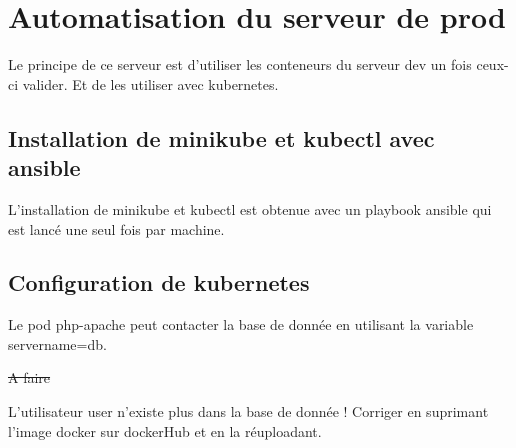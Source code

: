 \section{Automatisation du serveur de prod}
Le principe de ce serveur est d'utiliser les conteneurs du serveur dev un fois ceux-ci valider.
Et de les utiliser avec kubernetes.

\subsection{Installation de minikube et kubectl avec ansible}
L'installation de minikube et kubectl est obtenue avec  un playbook ansible qui est lancé une seul fois par machine.



\subsection{Configuration de kubernetes}
Le pod php-apache peut contacter la base de donnée en utilisant la variable servername=db.



\sout{\LARGE A faire}

L'utilisateur user n'existe plus dans la base de donnée !
Corriger en suprimant l'image docker sur dockerHub et en la réuploadant.